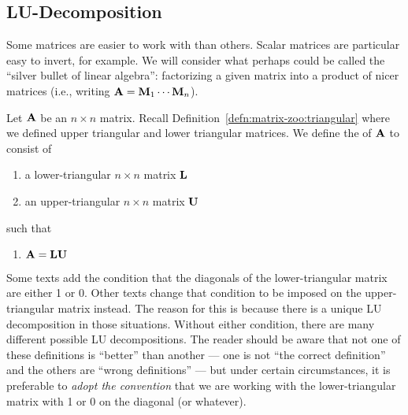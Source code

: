 \subsection{LU-Decomposition}

\M
Some matrices are easier to work with than others. Scalar matrices are
particular easy to invert, for example. We will consider what perhaps
could be called the ``silver bullet of linear algebra'': factorizing a
given matrix into a product of nicer matrices (i.e., writing $\mathbf{A}=\mathbf{M}_{1}\cdots\mathbf{M}_{n}$).

\begin{definition}
Let $\mathbf{A}$ be an $n\times n$ matrix.
Recall Definition~\ref{defn:matrix-zoo:triangular} where we defined
upper triangular and lower triangular matrices. 
We define the  of $\mathbf{A}$ to consist of
\begin{enumerate}
\item a lower-triangular $n\times n$ matrix $\mathbf{L}$
\item an upper-triangular $n\times n$ matrix $\mathbf{U}$
\end{enumerate}
such that
\begin{enumerate}
\item $\mathbf{A}=\mathbf{L}\mathbf{U}$
\end{enumerate}
\end{definition}

\begin{remark}
Some texts add the condition that the diagonals of the lower-triangular
matrix are either 1 or 0. Other texts change that condition to be
imposed on the upper-triangular matrix instead. The reason for this is
because there is a unique LU decomposition in those situations. Without
either condition, there are many different possible LU decompositions.
The reader should be aware that not one of these definitions is
``better'' than another --- one is not ``the correct definition'' and
the others are ``wrong definitions'' --- but under certain
circumstances, it is preferable to \emph{adopt the convention} that we are
working with the lower-triangular matrix with 1 or 0 on the diagonal (or
whatever). 
\end{remark}

